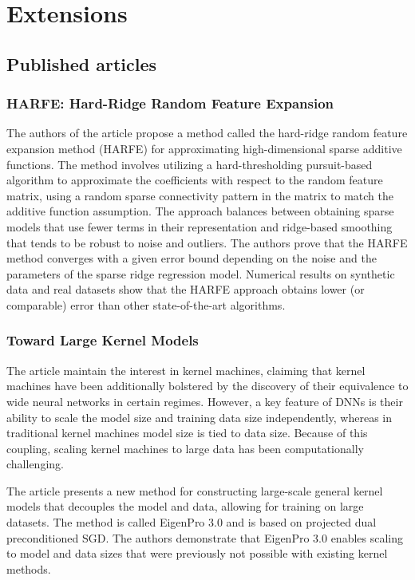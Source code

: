 \chapter{Extensions}
\section{Published articles}
\subsection{HARFE: Hard-Ridge Random Feature Expansion}
\cite{HARFE:_Hard-Ridge_Random_Feature_Expansion}
The authors of the article propose a method called the hard-ridge random feature expansion method (HARFE) for approximating high-dimensional sparse additive functions. The method involves utilizing a hard-thresholding pursuit-based algorithm to approximate the coefficients with respect to the random feature matrix, using a random sparse connectivity pattern in the matrix to match the additive function assumption. The approach balances between obtaining sparse models that use fewer terms in their representation and ridge-based smoothing that tends to be robust to noise and outliers. The authors prove that the HARFE method converges with a given error bound depending on the noise and the parameters of the sparse ridge regression model. Numerical results on synthetic data and real datasets show that the HARFE approach obtains lower (or comparable) error than other state-of-the-art algorithms.

\subsection{Toward Large Kernel Models}

\cite{Toward_Large_Kernel_Models}

The article maintain the interest in kernel machines, claiming that kernel machines have been additionally bolstered by the discovery of their equivalence to wide neural networks in certain regimes. However, a key feature of DNNs is their ability to scale the model size and training data size independently, whereas in traditional kernel machines model size is tied to data size. Because of this coupling, scaling kernel machines to large data has been computationally challenging. 

The article presents a new method for constructing large-scale general kernel models that decouples the model and data, allowing for training on large datasets. The method is called EigenPro 3.0 and is based on projected dual preconditioned SGD. The authors demonstrate that EigenPro 3.0 enables scaling to model and data sizes that were previously not possible with existing kernel methods.


